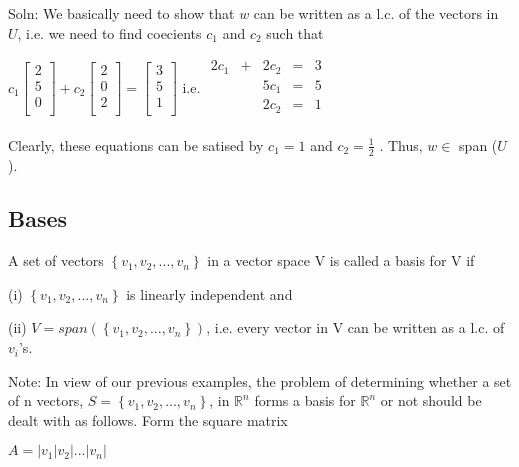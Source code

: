 \documentclass{extarticle}
\begin{document}
\begin{multicols}{2}
\begin{tcolorbox}[enhanced jigsaw,sharp corners,coltext=black,colback=BurntOrange!25!white,boxrule=0pt,breakable,size=minimal]
Soln: We basically need to show that $w$ can be written as a l.c. of the vectors in $U$, i.e. we need to find coecients $c_1$ and $c_2$ such that

$c_1 \left[ \begin{matrix}2\\5\\0\\\end{matrix} \right] + c_2 \left[ \begin{matrix}2\\0\\2\\\end{matrix} \right] = \left[ \begin{matrix}3\\5\\1\\\end{matrix} \right]$
i.e.
$\begin{matrix} 2c_1&+&2c_2&=&3\\&&5c_1&=&5\\&&2c_2&=&1\\ \end{matrix}$

Clearly, these equations can be satised by $c_1 = 1$ and $c_2 = \frac{1}{2}$ . Thus, $w \in$ span ($U$).

\end{tcolorbox}

\begin{tcolorbox}[enhanced jigsaw,sharp corners,coltext=black,colback=BurntOrange!25!white,boxrule=0pt,breakable,size=minimal]

\subsection{Bases}
A set of vectors $\left\{v_1,v_2,...,v_n\right\}$ in a vector space V is called a basis for V if

(i) $\left\{v_1,v_2,...,v_n\right\}$ is linearly independent and 

(ii) $V=span(\left\{v_1,v_2,...,v_n\right\})$, i.e. every vector in V can be written as a l.c. of $v_i$'s.

Note: In view of our previous examples, the problem of determining whether a set of n vectors, $S = \left\{v_1,v_2,...,v_n\right\}$, in ${\mathbb{R}}^n$ forms a basis for ${\mathbb{R}}^n$ or not should be dealt with as follows. Form the square matrix

$A = \left|v_1|v_2|...|v_n\right|$


\end{tcolorbox}
\end{multicols}
\end{document}
